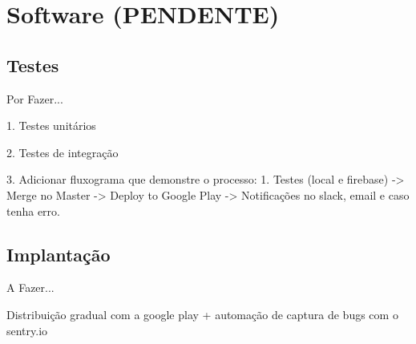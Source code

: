 \chapter{Software (PENDENTE)} \label{cha:software}

\section{Testes} \label{sec:software:testes}
Por Fazer...

1. Testes unitários

2. Testes de integração

3. Adicionar fluxograma que demonstre o processo: 1. Testes (local e firebase) -> Merge no Master -> Deploy to Google Play -> Notificações no slack, email e caso tenha erro.

\section{Implantação} \label{sec:software:implantacao}

A Fazer...

Distribuição gradual com a google play + automação de captura de bugs com o sentry.io
